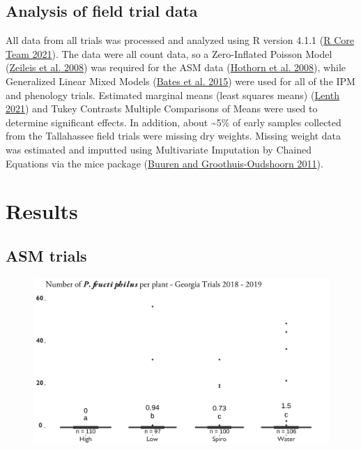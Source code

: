 \documentclass{ufdissertation}[overrideChapters] %
\begin{document}
{{\subsection{Analysis of field trial data}\label{analysis-of-field-trial-data}}

All data from all trials was processed and analyzed using R version 4.1.1 (\protect\hyperlink{ref-RCT2021}{R Core Team 2021}). The data were all count data, so a Zero-Inflated Poisson Model (\protect\hyperlink{ref-Zeileis2008}{Zeileis et al. 2008}) was required for the ASM data (\protect\hyperlink{ref-Hothorn2008}{Hothorn et al. 2008}), while Generalized Linear Mixed Models (\protect\hyperlink{ref-Bates2015}{Bates et al. 2015}) were used for all of the IPM and phenology trials. Estimated marginal means (least squares means) (\protect\hyperlink{ref-Lenth2021}{Lenth 2021}) and Tukey Contrasts Multiple Comparisons of Means were used to determine significant effects. In addition, about \textasciitilde5\% of early samples collected from the Tallahassee field trials were missing dry weights. Missing weight data was estimated and imputted using Multivariate Imputation by Chained Equations via the mice package (\protect\hyperlink{ref-vanBuuren2011}{Buuren and Groothuis-Oudshoorn 2011}).

\hypertarget{results-2}{%
\section{Results}\label{results-2}}

\hypertarget{asm-trials}{%
\subsection{ASM trials}\label{asm-trials}}
\begin{figure}

{\centering \includegraphics[width=1\linewidth]{figure/rrv_actigard_graph} 

}
\end{figure}}
\end{document}
